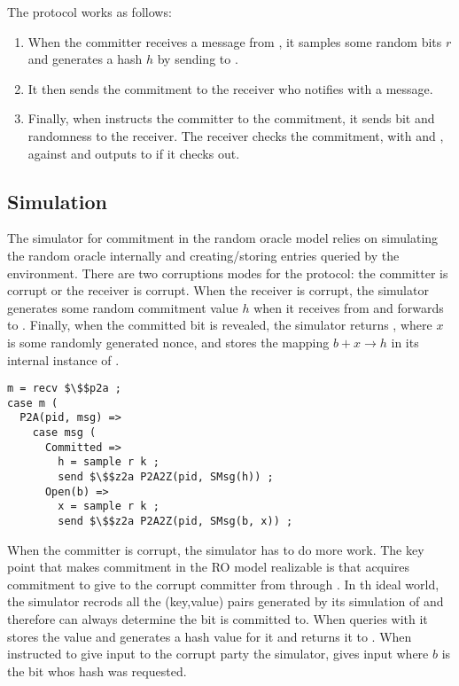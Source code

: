 The protocol works as follows:
\begin{enumerate}
\item When the committer receives a  message from \Z, it samples some random bits $r$ and generates a hash $h$ by sending  to \Fro.
\item It then sends the commitment to the receiver who notifies \Z with a  message.
\item Finally, when \Z instructs the committer to  the commitment, it sends bit  and randomness  to the receiver. The receiver checks the commitment, with  and , against \Fro and outputs  to \Z if it checks out.
\end{enumerate}

\subsection{Simulation}
The simulator for commitment in the random oracle model relies on simulating the random oracle internally and creating/storing entries queried by the environment.
There are two corruptions modes for the protocol: the committer is corrupt or the receiver is corrupt.
When the receiver is corrupt, the simulator generates some random commitment value $h$ when it receives  from \Fcom and forwards  to \Z. 
Finally, when the committed bit is revealed, the simulator returns , where $x$ is some randomly generated nonce, and stores the mapping $b+x \rightarrow h$ in its internal instance of \Fro.

\begin{lstlisting}[basicstyle=\small\BeraMonottFamily, mathescape, frame=single]
m = recv $\$$p2a ;
case m (
  P2A(pid, msg) =>
   	case msg (
      Committed =>
        h = sample r k ;
        send $\$$z2a P2A2Z(pid, SMsg(h)) ;
      Open(b) =>
	    x = sample r k ;
        send $\$$z2a P2A2Z(pid, SMsg(b, x)) ;
\end{lstlisting}

When the committer is corrupt, the simulator has to do more work. 
The key point that makes commitment in the RO model realizable is that \Z acquires commitment to give to the corrupt committer from \Fro through \A. 
In th ideal world, the simulator recrods all the (key,value) pairs generated by its simulation of \Fro and therefore can always determine the bit \Z is committed to.
When \Z queries \Sim with  it stores the value and generates a hash value for it and returns it to \Z. 
When instructed to give input to the corrupt party the simulator, \Sim gives input  where $b$ is the bit whos hash was requested.

